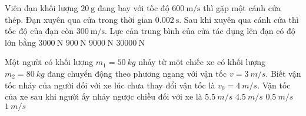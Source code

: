 \begin{ex}
Viên đạn khối lượng $\SI{20}{\gram}$ đang bay với tốc độ $\SI{600}{\meter/\second}$ thì gặp một cánh cửa thép. Đạn xuyên qua cửa trong thời gian $\SI{0.002}{\second}$. Sau khi xuyên qua cánh cửa thì tốc độ của đạn còn $\SI{300}{\meter/\second}$. Lực cản trung bình của cửa tác dụng lên đạn có độ lớn bằng	
	\choice
	{\True $\SI{3000}{\newton}$}
	{$\SI{900}{\newton}$}
	{$\SI{9000}{\newton}$}
	{$\SI{30000}{\newton}$}
\end{ex}
\begin{ex}
Một người có khối lượng $m_1=\SI{50}{kg}$ nhảy từ một chiếc xe có khối lượng $m_2 = \SI{80}{kg}$ đang chuyển động theo phương ngang với vận tốc $v = \SI{3}{m/s}$. Biết vận tốc nhảy của người đối với xe lúc chưa thay đổi vận tốc là $v_0 = \SI{4}{m/s}$. Vận tốc của xe sau khi người ấy nhảy ngược chiều đối với xe là	
	\choice
	{\True $\SI{5,5}{m/s}$}
	{$\SI{4,5}{m/s}$}
	{$\SI{0,5}{m/s}$}
	{$\SI{1}{m/s}$}
\end{ex}
